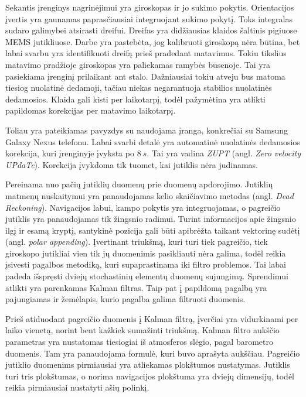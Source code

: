 Sekantis įrenginys nagrinėjimui yra giroskopas ir jo sukimo pokytis. Orientacijos įvertis yra gaunamas paprasčiausiai integruojant sukimo pokytį. Toks integralas sudaro galimybei atsirasti dreifui. Dreifas yra didžiausias klaidos šaltinis pigiuose MEMS jutikliuose. Darbe yra pastebėta, jog kalibruoti giroskopą nėra būtina, bet labai svarbu yra identifikuoti dreifą prieš pradedant matavimus. Tokiu tikslius matavimo pradžioje giroskopas yra paliekamas ramybės būsenoje. Tai yra pasiekiama įrenginį prilaikant ant stalo. Dažniausiai tokiu atveju bus matoma tiesiog nuolatinė dedamoji, tačiau niekas negarantuoja stabilios nuolatinės dedamosios. Klaida gali kisti per laikotarpį, todėl pažymėtina yra atlikti papildomas korekcijas per matavimo laikotarpį.

Toliau yra pateikiamas pavyzdys su naudojama įranga, konkrečiai su Samsung Galaxy Nexus telefonu. Labai svarbi detalė yra automatinė nuolatinės dedamosios korekcija, kuri įrenginyje įvyksta po $8~s$. Tai yra vadina \textit{ZUPT} (angl. \textit{Zero velocity UPdaTe}). Korekcija įvykdoma tik tuomet, kai jutiklis nėra judinamas. 

Pereinama nuo pačių jutiklių duomenų prie duomenų apdorojimo. Jutiklių matmenų nuskaitymui yra panaudojamas kelio skaičiavimo metodas (angl. \textit{Dead Reckoning}). Navigacijos labui, kampo pokytis yra integruojamas, o pagreičio jutiklis yra panaudojamas tik žingsnio radimui. Turint informacijos apie žingsnio ilgį ir esamą kryptį, santykinė pozicija gali būti apibrėžta taikant vektorinę sudėtį (angl. \textit{polar appending}). Įvertinant triukšmą, kuri turi tiek pagreičio, tiek giroskopo jutikliai vien tik jų duomenimis pasikliauti nėra galima, todėl reikia įsivesti pagalbos metodiką, kuri supaprastinama iki filtro problemos. Tai labai padeda išspręsti dviejų stochastinių elementų duomenų sujungimą. Sprendimui atlikti yra parenkamas Kalman filtras. Taip pat į papildomą pagalbą yra pajungiamas ir žemėlapis, kurio pagalba galima filtruoti duomenis.

Prieš atiduodant pagreičio duomenis į Kalman filtrą, įverčiai yra vidurkinami per laiko vienetą, norint bent kažkiek sumažinti triukšmą. Kalman filtro aukščio parametras yra nustatomas tiesiogiai iš atmosferos slėgio, pagal barometro duomenis. Tam yra panaudojama formulė, kuri buvo aprašyta aukščiau. Pagreičio jutiklio duomenims pirmiausiai yra atliekamas plokštumos nustatymas. Jutiklis turi tris plokštumas, o norima navigacijos plokštuma yra dviejų dimensijų, todėl reikia pirmiausiai nustatyti ašių polinkį.

